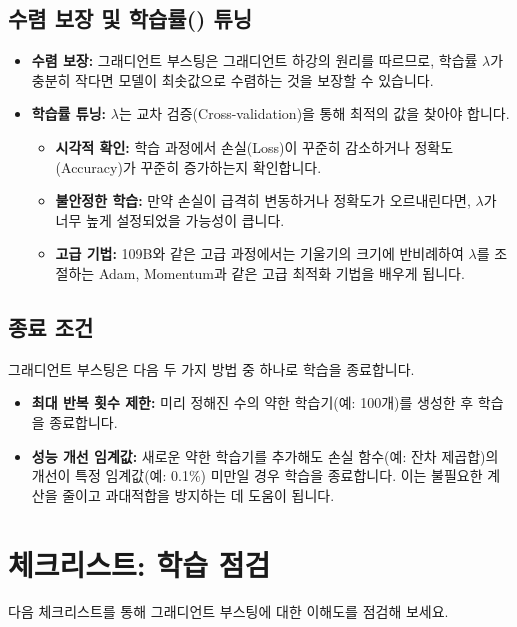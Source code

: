 \documentclass[11pt,a4paper]{book}
\theoremstyle{definition}
\begin{document}
\subsection{수렴 보장 및 학습률(\texttt{\lambda}) 튜닝}
\begin{itemize}
    \item \textbf{수렴 보장:} 그래디언트 부스팅은 그래디언트 하강의 원리를 따르므로, 학습률 $\lambda$가 충분히 작다면 모델이 최솟값으로 수렴하는 것을 보장할 수 있습니다.
    \item \textbf{학습률 튜닝:} $\lambda$는 교차 검증(Cross-validation)을 통해 최적의 값을 찾아야 합니다.
        \begin{itemize}
            \item \textbf{시각적 확인:} 학습 과정에서 손실(Loss)이 꾸준히 감소하거나 정확도(Accuracy)가 꾸준히 증가하는지 확인합니다.
            \item \textbf{불안정한 학습:} 만약 손실이 급격히 변동하거나 정확도가 오르내린다면, $\lambda$가 너무 높게 설정되었을 가능성이 큽니다.
            \item \textbf{고급 기법:} 109B와 같은 고급 과정에서는 기울기의 크기에 반비례하여 $\lambda$를 조절하는 Adam, Momentum과 같은 고급 최적화 기법을 배우게 됩니다.
        \end{itemize}
\end{itemize}

\subsection{종료 조건}
그래디언트 부스팅은 다음 두 가지 방법 중 하나로 학습을 종료합니다.
\begin{itemize}
    \item \textbf{최대 반복 횟수 제한:} 미리 정해진 수의 약한 학습기(예: 100개)를 생성한 후 학습을 종료합니다.
    \item \textbf{성능 개선 임계값:} 새로운 약한 학습기를 추가해도 손실 함수(예: 잔차 제곱합)의 개선이 특정 임계값(예: 0.1\%) 미만일 경우 학습을 종료합니다. 이는 불필요한 계산을 줄이고 과대적합을 방지하는 데 도움이 됩니다.
\end{itemize}


\section{체크리스트: 학습 점검}
다음 체크리스트를 통해 그래디언트 부스팅에 대한 이해도를 점검해 보세요.
\end{document}

